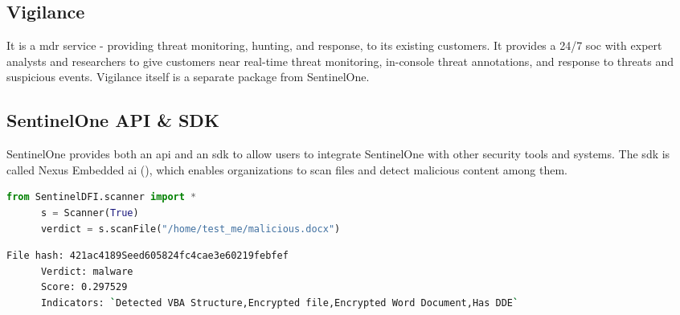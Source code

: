 \begin{multicols}{2}
      \subsection{Vigilance}
      It is a \acrshort{mdr} service - providing threat monitoring, hunting, and response, to its existing customers. It
      provides a 24/7 \acrshort{soc} with expert analysts and researchers to give customers near real-time threat monitoring,
      in-console threat annotations, and response to threats and suspicious events. Vigilance itself is a separate package from
      SentinelOne.

      \subsection{SentinelOne API \& SDK}
      SentinelOne provides both an \acrshort{api} and an \acrshort{sdk} to allow users to integrate SentinelOne with other
      security tools and systems. The \acrshort{sdk} is called Nexus Embedded \acrshort{ai} (\textit{\cite{nexusSDK}}), which
      enables organizations to scan files and detect malicious content among them.
\end{multicols}

\begin{lstlisting}[language=Python, caption=SentinelOne SDK implementation]
      from SentinelDFI.scanner import *
      s = Scanner(True)
      verdict = s.scanFile("/home/test_me/malicious.docx")
\end{lstlisting}

\begin{lstlisting}[language=bash]
      File hash: 421ac4189Seed605824fc4cae3e60219febfef
      Verdict: malware
      Score: 0.297529
      Indicators: `Detected VBA Structure,Encrypted file,Encrypted Word Document,Has DDE`
\end{lstlisting}

